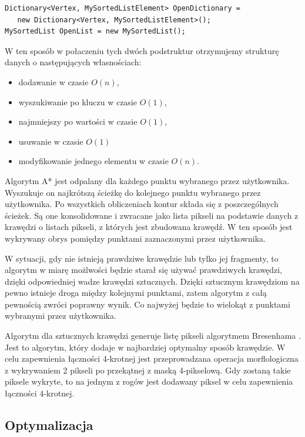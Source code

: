 \documentclass[a4paper,11pt,twoside]{report}
\theoremstyle{definition}
\begin{document}
\begin{verbatim}
Dictionary<Vertex, MySortedListElement> OpenDictionary = 
   new Dictionary<Vertex, MySortedListElement>();
MySortedList OpenList = new MySortedList();
\end{verbatim}

W ten sposób w połaczeniu tych dwóch podstruktur otrzymujemy strukturę danych o następujących własnościach:
\begin{itemize}[noitemsep]
\item dodawanie w czasie $O(n)$,
\item wyszukiwanie po kluczu w czasie $O(1)$,
\item najmniejszy po wartości w czasie $O(1)$,
\item usuwanie w czasie $O(1)$
\item modyfikowanie jednego elementu w czasie $O(n)$.
\end{itemize}

Algorytm A* jest odpalany dla każdego punktu wybranego przez użytkownika. Wyszukuje on najkrótszą ścieżkę do kolejnego punktu wybranego przez użytkownika. Po wszystkich obliczeniach kontur składa się z poszczególnych ścieżek. Są one konsolidowane i zwracane jako lista pikseli na podstawie danych z krawędzi o listach pikseli, z których jest zbudowana krawędź. W ten sposób jest wykrywany obrys pomiędzy punktami zaznaczonymi przez użytkownika.

W sytuacji, gdy nie istnieją prawdziwe krawędzie lub tylko jej fragmenty, to algorytm w miarę możlwości będzie starał się używać prawdziwych krawędzi, dzięki odpowiedniej wadze krawędzi sztucznych. Dzięki sztucznym krawędziom na pewno istnieje droga między kolejnymi punktami, zatem algorytm z całą pewnością zwróci poprawny wynik. Co najwyżej będzie to wielokąt z punktami wybranymi przez użytkownika. 

Algorytm dla sztucznych krawędzi generuje listę pikseli algorytmem Bresenhama \cite{Bresenham}. Jest to algorytm, który dodaje w najbardziej optymalny sposób krawędzie. W celu zapewnienia łączności 4-krotnej jest przeprowadzana operacja morflologiczna z wykrywaniem 2 pikseli po przekątnej z maską 4-pikselową. Gdy zostaną takie piksele wykryte, to na jednym z rogów jest dodawany piksel w celu zapewnienia łączności 4-krotnej.

\subsection {Optymalizacja}
\end{document}
